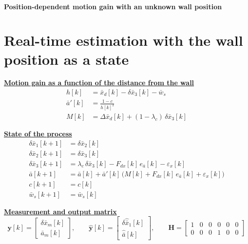 \documentclass[11pt,a4paper]{ctexart}
\newcommand{\lc}{\lambda_c}
\newcommand{\bx}{\bar{x}}
\newcommand{\ba}{\bar{a}}
\newcommand{\bw}{\bar{w}}
\newcommand{\hd}[1]{\par\bigskip\noindent\underline{\textbf{#1}}}
\begin{document}
\begin{center}
{\Large\textbf{Position-dependent motion gain with an unknown wall position}}
\end{center}

\section{Real-time estimation with the wall position as a state}

\hd{Motion gain as a function of the distance from the wall}
\[
\begin{aligned}
h[k] &= \bx_d[k] - \delta\bx_3[k] - \bw_s \\
\ba'[k] &= \frac{1 - c}{h[k]^{2}} \\
M[k] &= \Delta\bx_d[k] + (1-\lc)\,\delta\bx_3[k]
\end{aligned}
\]

\hd{State of the process}
\[
\begin{aligned}
\delta\bx_1[k+1] &= \delta\bx_2[k] \\
\delta\bx_2[k+1] &= \delta\bx_3[k] \\
\delta\bx_3[k+1] &= \lc\,\delta\bx_3[k] - F_{dx}[k]\,e_{\ba}[k] - \varepsilon_x[k] \\
\ba[k+1] &= \ba[k] + \ba'[k]\,\big(M[k] + F_{dx}[k]\,e_{\ba}[k] + \varepsilon_x[k]\big) \\
c[k+1] &= c[k] \\
\bw_s[k+1] &= \bw_s[k]
\end{aligned}
\]

\hd{Measurement and output matrix}
\[
\mathbf{y}[k] = \begin{bmatrix} \delta\bx_m[k] \\ \ba_m[k] \end{bmatrix},
\qquad
\hat{\mathbf{y}}[k] = \begin{bmatrix} \delta\hat{\bx}_1[k] \\ \hat{\ba}[k] \end{bmatrix},
\qquad
\mathbf{H} =
\begin{bmatrix}
1 & 0 & 0 & 0 & 0 & 0 \\
0 & 0 & 0 & 1 & 0 & 0
\end{bmatrix}
\]
\end{document}
